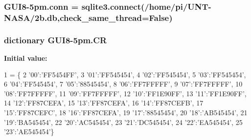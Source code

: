 \subsubsection[{\texorpdfstring{conn}{conn}}]{\setlength{\rightskip}{0pt plus 5cm}G\+U\+I8-\/5pm.\+conn = sqlite3.\+connect(\textquotesingle{}/home/pi/U\+NT-\/N\+A\+SA/2b.\+db\textquotesingle{},check\+\_\+same\+\_\+thread=\+False)}\hypertarget{namespaceGUI8-5pm_a754cc5d2663b1ceb611c13b8e4ec91ad}{}\label{namespaceGUI8-5pm_a754cc5d2663b1ceb611c13b8e4ec91ad}
\subsubsection[{\texorpdfstring{CR}{CR}}]{\setlength{\rightskip}{0pt plus 5cm}dictionary G\+U\+I8-\/5pm.\+CR}\hypertarget{namespaceGUI8-5pm_a14d7ab1cf4721110f93f3f0b29286697}{}\label{namespaceGUI8-5pm_a14d7ab1cf4721110f93f3f0b29286697}
{\bfseries Initial value\+:}
\begin{DoxyCode}
1 = \{
2 \textcolor{stringliteral}{'00'}:\textcolor{stringliteral}{'FF5454FF'},
3 \textcolor{stringliteral}{'01'}:\textcolor{stringliteral}{'FF545454'},
4 \textcolor{stringliteral}{'02'}:\textcolor{stringliteral}{'FF545454'},
5 \textcolor{stringliteral}{'03'}:\textcolor{stringliteral}{'FF545454'},
6 \textcolor{stringliteral}{'04'}:\textcolor{stringliteral}{'FF545454'},
7 \textcolor{stringliteral}{'05'}:\textcolor{stringliteral}{'88545454'},
8 \textcolor{stringliteral}{'06'}:\textcolor{stringliteral}{'FF7FFFFF'},
9 \textcolor{stringliteral}{'07'}:\textcolor{stringliteral}{'FF7FFFFF'},
10 \textcolor{stringliteral}{'08'}:\textcolor{stringliteral}{'FF7FFFFF'},
11 \textcolor{stringliteral}{'09'}:\textcolor{stringliteral}{'FF7FFFFF'},
12 \textcolor{stringliteral}{'10'}:\textcolor{stringliteral}{'FF1E90FF'},
13 \textcolor{stringliteral}{'11'}:\textcolor{stringliteral}{'FF1E90FF'},
14 \textcolor{stringliteral}{'12'}:\textcolor{stringliteral}{'FF87CEFA'},
15 \textcolor{stringliteral}{'13'}:\textcolor{stringliteral}{'FF87CEFA'},
16 \textcolor{stringliteral}{'14'}:\textcolor{stringliteral}{'FF87CEFB'},
17 \textcolor{stringliteral}{'15'}:\textcolor{stringliteral}{'FF87CEFC'},
18 \textcolor{stringliteral}{'16'}:\textcolor{stringliteral}{'FF87CEFA'},
19 \textcolor{stringliteral}{'17'}:\textcolor{stringliteral}{'88545454'},
20 \textcolor{stringliteral}{'18'}:\textcolor{stringliteral}{'AB545454'},
21 \textcolor{stringliteral}{'19'}:\textcolor{stringliteral}{'BA545454'},
22 \textcolor{stringliteral}{'20'}:\textcolor{stringliteral}{'AC545454'},
23 \textcolor{stringliteral}{'21'}:\textcolor{stringliteral}{'DC545454'},
24 \textcolor{stringliteral}{'22'}:\textcolor{stringliteral}{'EA545454'},
25 \textcolor{stringliteral}{'23'}:\textcolor{stringliteral}{'AE545454'}\}
\end{DoxyCode}
